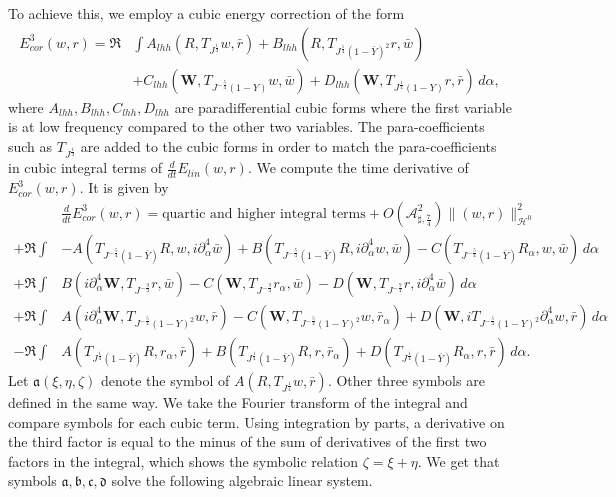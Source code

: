 \documentclass[10pt]{amsart}
\theoremstyle{remark}
\theoremstyle{definition}
\numberwithin{equation}{section}
\newcommand{\p}{\partial}
\renewcommand{\H}{{\mathcal H }}
\newcommand{\al}{\alpha}
\newcommand{\f}{\frac}
\newcommand{\bw}{\mathbf{W}}
\newcommand{\ASSharp}{{\mathcal{A}_{\sharp,\frac{7}{4}}^2}}
\begin{document}
To achieve this, we employ a cubic energy correction of the form 
\begin{align*}
    E^3_{cor}(w,r) = \Re &\int A_{lhh}\left(R, T_{J^{\f14}}w, \bar{r}\right) + B_{lhh}\left(R, T_{J^{\f14}(1-\bar{Y})^2}r, \bar{w}\right) \\
    &+ C_{lhh}\left( \bw, T_{J^{-\f54}(1-Y)}w, \bar{w}\right) + D_{lhh}\left( \bw, T_{J^{\f14}(1-Y)}r, \bar{r}\right) \, d\alpha,
\end{align*}
where $A_{lhh},B_{lhh},C_{lhh},D_{lhh}$ are paradifferential cubic forms where the first variable is at low frequency compared to the other two variables. 
The para-coefficients such as $T_{J^{\f14}}$ are added to the cubic forms in order to match the para-coefficients in cubic integral terms of $\frac{d}{dt}E_{lin}(w,r)$.
We compute the time derivative of $E^3_{cor}(w,r)$.
It is given by
\begin{align*}
&\frac{d}{dt}  E^3_{cor}(w,r) = \text{quartic and higher integral terms} +  O\left(\ASSharp \right) \|(w,r)\|_{\H^0}^2 \\
+ \Re\int& -A\left( T_{J^{-\f54}(1-\bar{Y})}R, w, i\p_\al^4\bar{w}\right) + B\left(T_{J^{-\f54}(1-\bar{Y})}R, i\p_\al^4 w, \bar{w}\right)-C\left(T_{J^{-\f54}(1-\bar{Y})}R_\alpha, w, \bar{w}\right)\,d\al  \\
+\Re \int&  B\left(i \p_\al^4\bw, T_{J^{-\f94}}r, \bar{w}\right) - C\left(\bw, T_{J^{-\f94}}r_{\alpha}, \bar{w}\right)- D\left(\bw, T_{J^{-\f94}}r, i\p_\al^4\bar{w}\right)\,d\al  \\
+\Re \int&  A\left(i \p_\al^4\bw, T_{J^{-\f54}(1-Y)^2}w, \bar{r}\right) - C\left(\bw, T_{J^{-\f54}(1-Y)^2}w, \bar{r}_\alpha\right)+ D\left(\bw, iT_{J^{-\f54}(1-Y)^2}\p_\al^4 w, \bar{r}\right)\,d\al \\
-\Re \int&A\left(T_{J^{\f14}(1-\bar{Y})}R, r_\alpha, \bar{r}\right) + B\left(T_{J^{\f14}(1-\bar{Y})}R, r, \bar{r}_\alpha\right)+ D\left(T_{J^{\f14}(1-\bar{Y})}R_\alpha, r, \bar{r}\right) \,d\alpha.
\end{align*}
Let $\mathfrak{a}(\xi, \eta, \zeta)$ denote the symbol of $A\left(R, T_{J^{\f14}}w, \bar{r}\right)$.
Other three symbols are defined in the same way.
We take the Fourier transform of the integral and compare symbols for each cubic term.
Using integration by parts, a derivative on the third factor is equal to the minus of the sum of  derivatives of the first two factors  in the integral, which shows the symbolic relation $\zeta = \xi + \eta$.
We get that symbols  $\mathfrak{a}, \mathfrak{b}, \mathfrak{c}, \mathfrak{d}$ solve the following algebraic linear system.
\end{document}
